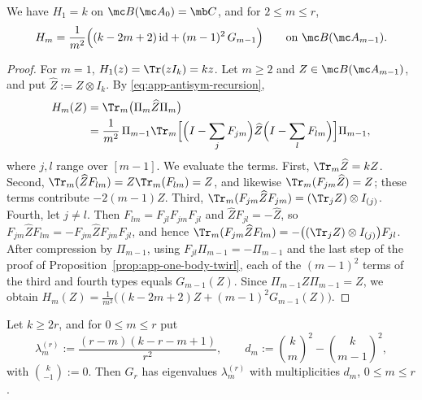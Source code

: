 \begin{proposition}\label{prop:app-lift-reduce}
We have \(H_1=k\) on \(\mc B(\mc A_0)=\mb C\), and for \(2\le m\le r\),
\begin{equation}
    H_m=\frac1{m^2}\Bigl((k-2m+2)\,\mathrm{id}+(m-1)^2\,G_{m-1}\Bigr)
    \qquad\text{on }\mc B(\mc A_{m-1}).
    \label{eq:app-lift-reduce}
\end{equation}
\end{proposition}
 
\begin{proof}
For \(m=1\), \(H_1(z)=\Tr(zI_k)=kz\).  Let \(m\geq2\) and
\(Z\in\mc B(\mc A_{m-1})\), and put \(\widehat Z:=Z\otimes I_k\).  By
\eqref{eq:app-antisym-recursion},
\begin{equation}
\begin{aligned}
    H_m(Z)&=\Tr_m\bigl(\Pi_m\widehat Z\Pi_m\bigr)\\
    &=\frac1{m^2}\,\Pi_{m-1}\Tr_m\Bigl[
       \Bigl(I-\sum_jF_{jm}\Bigr)\widehat Z\Bigl(I-\sum_lF_{lm}\Bigr)
     \Bigr]\Pi_{m-1},
\end{aligned}
\end{equation}
where \(j,l\) range over \([m-1]\).  We evaluate the terms.  First,
\(\Tr_m\widehat Z=kZ\).  Second,
\(\Tr_m(\widehat ZF_{lm})=Z\Tr_m(F_{lm})=Z\), and likewise
\(\Tr_m(F_{jm}\widehat Z)=Z\); these terms contribute \(-2(m-1)Z\).
Third, \(\Tr_m(F_{jm}\widehat ZF_{jm})=(\Tr_jZ)\otimes I_{(j)}\).
Fourth, let \(j\neq l\).  Then \(F_{lm}=F_{jl}F_{jm}F_{jl}\) and
\(\widehat ZF_{jl}=-\widehat Z\), so
\(F_{jm}\widehat ZF_{lm}=-F_{jm}\widehat ZF_{jm}F_{jl}\), and hence
\(\Tr_m(F_{jm}\widehat ZF_{lm})=-\bigl((\Tr_jZ)\otimes I_{(j)}\bigr)F_{jl}\).
After compression by \(\Pi_{m-1}\), using \(F_{jl}\Pi_{m-1}=-\Pi_{m-1}\)
and the last step of the proof of Proposition~\ref{prop:app-one-body-twirl},
each of the \((m-1)^2\) terms of the third and fourth types equals
\(G_{m-1}(Z)\).  Since \(\Pi_{m-1}Z\Pi_{m-1}=Z\), we obtain
\(H_m(Z)=\frac1{m^2}\bigl((k-2m+2)Z+(m-1)^2G_{m-1}(Z)\bigr)\).
\end{proof}
 
\begin{proposition}\label{prop:app-spectrum-G}
Let \(k\ge2r\), and for \(0\le m\le r\) put
\begin{equation}
    \lambda_m^{(r)}:=\frac{(r-m)(k-r-m+1)}{r^2},
    \qquad
    d_m:=\binom km^2-\binom k{m-1}^2,
\end{equation}
with \(\binom k{-1}:=0\).  Then \(G_r\) has eigenvalues
\(\lambda_m^{(r)}\) with multiplicities \(d_m\), \(0\le m\le r\).
\end{proposition}
 
